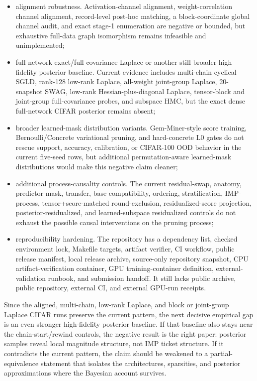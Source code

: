 \documentclass{article}
\newif\iflotteryneurips
\newif\iflotteryincludeappendix
\begin{document}
\begin{itemize}
  \item alignment robustness. Activation-channel alignment, weight-correlation
  channel alignment, record-level post-hoc matching, a block-coordinate global
  channel audit, and exact stage-1 enumeration are negative or bounded, but
  exhaustive full-data graph isomorphism remains infeasible and unimplemented;
  \item full-network exact/full-covariance Laplace or another still broader
  high-fidelity posterior baseline. Current evidence includes multi-chain
  cyclical SGLD, rank-128 low-rank Laplace, all-weight joint-group Laplace,
  20-snapshot SWAG, low-rank Hessian-plus-diagonal Laplace, tensor-block and
  joint-group full-covariance probes, and subspace HMC, but the exact dense
  full-network CIFAR posterior remains absent;
  \item broader learned-mask distribution variants. Gem-Miner-style score
  training, Bernoulli/Concrete variational pruning, and hard-concrete L0 gates
  do not rescue support, accuracy, calibration, or CIFAR-100 OOD behavior in
  the current five-seed rows, but additional permutation-aware learned-mask
  distributions would make this negative claim cleaner;
  \item additional process-causality controls. The current residual-swap,
  anatomy, predictor-mask, transfer, base compatibility, ordering,
  stratification, IMP-process, tensor+score-matched round-exclusion,
  residualized-score projection, posterior-residualized, and learned-subspace
  residualized controls do not exhaust the possible causal interventions on the
  pruning process;
  \item reproducibility hardening. The repository has a dependency list,
  checked environment lock, Makefile targets, artifact verifier, CI workflow,
  public release manifest, local release archive, source-only repository
  snapshot, CPU artifact-verification container, GPU training-container
  definition, external-validation runbook, and submission handoff. It still
  lacks public archive, public repository, external CI, and external GPU-run
  receipts.
\end{itemize}

Since the aligned, multi-chain, low-rank Laplace, and block or joint-group
Laplace CIFAR runs preserve the current pattern, the next decisive empirical
gap is an even stronger high-fidelity posterior baseline. If that baseline also
stays near the chain-start/rewind controls, the negative result is the right
paper: posterior samples reveal local magnitude structure, not IMP ticket
structure. If it contradicts the current pattern, the claim should be weakened
to a partial-equivalence statement that isolates the architectures, sparsities,
and posterior approximations where the Bayesian account survives.

\clearpage



\iflotteryincludeappendix
  \clearpage
  \appendix
  \section{Generated Evidence Tables}

  
\fi

\iflotteryneurips
  \clearpage
  
\fi
\end{document}
